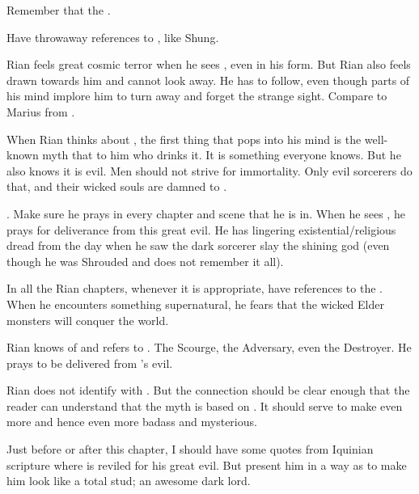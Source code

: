 \begin{changes}
    Remember that the .
    
    Have throwaway references to , like Shung. 
  
    \begin{comment}
      \subparagraph{Rian sees them}
    \end{comment}
    Rian feels great cosmic terror when he sees \Ishnaruchaefir, even in his \Scathaese form. 
    But Rian also feels drawn towards him and cannot look away.
    He has to follow, even though parts of his mind implore him to turn away and forget the strange sight.
    Compare to Marius from \cite{VideoGame:DiabloII}.
    
    When Rian thinks about \dragons, the first thing that pops into his mind is the well-known myth that  to him who drinks it. 
    It is something everyone knows. 
    But he also knows it is evil.
    Men should not strive for immortality.
    Only evil sorcerers do that, and their wicked souls are damned to \itzach. 
    
    .
    Make sure he prays in every chapter and scene that he is in.
    When he sees \Ishnaruchaefir, he prays for deliverance from this great evil.
    He has lingering existential/religious dread from the day when he saw the dark sorcerer slay the shining god (even though he was Shrouded and does not remember it all). 
    
    In all the Rian chapters, whenever it is appropriate, have references to the . 
    When he encounters something supernatural, he fears that the wicked Elder monsters will conquer the world. 
    
    Rian knows of and refers to \Isphet. 
    The Scourge, the Adversary, even the Destroyer. 
    He prays to be delivered from \Isphet's evil. 
    
    Rian does not identify \Ishnaruchaefir with \Isphet. 
    But the connection should be clear enough that the reader can understand that the \Isphet myth is based on \Ishnaruchaefir. 
    It should serve to make \Ishnaruchaefir even more  and hence even more badass and mysterious. 
    
    Just before or after this chapter, I should have some quotes from Iquinian scripture where \Isphet is reviled for his great evil.
    But present him in a way as to make him look like a total stud; an awesome dark lord. 
    

\end{changes}
